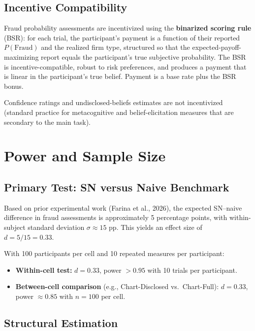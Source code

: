 \documentclass[12pt]{article}
\theoremstyle{definition}
\begin{document}
\subsection{Incentive Compatibility}

Fraud probability assessments are incentivized using the \textbf{binarized scoring rule} (BSR): for each trial, the participant's payment is a function of their reported $P(\text{Fraud})$ and the realized firm type, structured so that the expected-payoff-maximizing report equals the participant's true subjective probability. The BSR is incentive-compatible, robust to risk preferences, and produces a payment that is linear in the participant's true belief. Payment is a base rate plus the BSR bonus.

Confidence ratings and undisclosed-beliefs estimates are not incentivized (standard practice for metacognitive and belief-elicitation measures that are secondary to the main task).


\section{Power and Sample Size}
\label{sec:power}

\subsection{Primary Test: SN versus Naive Benchmark}

Based on prior experimental work (Farina et al., 2026), the expected SN--naive difference in fraud assessments is approximately 5 percentage points, with within-subject standard deviation $\sigma \approx 15$ pp. This yields an effect size of $d = 5/15 = 0.33$.

With 100 participants per cell and 10 repeated measures per participant:
\begin{itemize}[nosep]
\item \textbf{Within-cell test:} $d = 0.33$, power $> 0.95$ with 10 trials per participant.
\item \textbf{Between-cell comparison} (e.g., Chart-Disclosed vs.\ Chart-Full): $d = 0.33$, power $\approx 0.85$ with $n = 100$ per cell.
\end{itemize}

\subsection{Structural Estimation}
\end{document}
